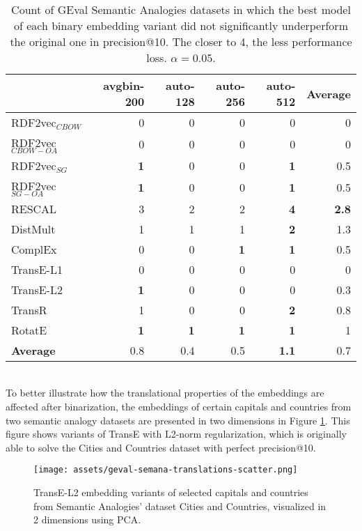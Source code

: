 \documentclass[11pt,titlepage,oneside,openany]{book}
\begin{document}
\begin{table}[h!]
\centering
\begin{tabular}{lrrrrr}
\toprule
{} &  avgbin-200 &  auto-128 &  auto-256 &  auto-512 &  \textbf{Average} \\
\midrule
RDF2vec$_{CBOW}$ &	0 &	0 &	0 &	0 & 0\\
RDF2vec$_{CBOW-OA}$ &	0 &	0 &	0 &	0 & 0 \\
RDF2vec$_{SG}$       &	\textbf{1} &         0  &         0  &	\textbf{1} & 0.5 \\
RDF2vec$_{SG-OA}$    &	\textbf{1} &         0  &         0  &	\textbf{1} & 0.5 \\
RESCAL               &           3  &         2  &         2  &	\textbf{4} & \textbf{2.8} \\
DistMult             &           1  &         1  &         1  &	\textbf{2} & 1.3\\
ComplEx              &           0  &         0  &	\textbf{1} &	\textbf{1} & 0.5 \\
TransE-L1 &	0 &	0 &	0 &	0 & 0 \\
TransE-L2            &	\textbf{1} &         0  &         0  &         0  & 0.3 \\
TransR               &           1  &         0  &         0  &	\textbf{2} & 0.8\\
RotatE               &	\textbf{1} &	\textbf{1} &	\textbf{1} &	\textbf{1} & 1 \\
\midrule
\textbf{Average}     &        0.8  &      0.4  &      0.5  &	\textbf{1.1} & 0.7 \\
\bottomrule
\end{tabular}
\caption{Count of GEval Semantic Analogies datasets in which the best model of each binary embedding variant did not significantly underperform the original one in precision@10. The closer to 4, the less performance loss. $\alpha=0.05$.}
\label{tab:geval-semana-p-at-10-significantly-not-worse}
\end{table}
\\
To better illustrate how the translational properties of the embeddings are affected after binarization, the embeddings of certain capitals and countries from two semantic analogy datasets are presented in two dimensions in Figure \ref{fig:geval-semana-translations-scatter}. This figure shows variants of TransE with L2-norm regularization, which is originally able to solve the Cities and Countries
dataset with perfect precision@10.\\
\begin{figure}[h!]
    \centering
    \centerline{\texttt{[image: assets/geval-semana-translations-scatter.png]}}
    \caption{TransE-L2 embedding variants of selected capitals and countries from Semantic Analogies' dataset Cities and Countries, visualized in 2 dimensions using PCA.}
    \label{fig:geval-semana-translations-scatter}
\end{figure}
\end{document}
